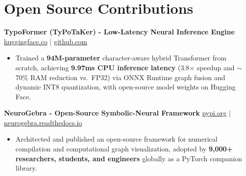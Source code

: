 \documentclass[9.5pt,a4paper]{article}
\begin{document}
\section*{Open Source Contributions}
\noindent
\textbf{TypoFormer (TyPoTaKer) - Low-Latency Neural Inference Engine} \hfill \href{https://huggingface.co/fahiiim/TypoFormer}{huggingface.co} $\vert$ \href{https://github.com/fahiiim/TyPoTaKer}{github.com}
\begin{itemize}
    \item Trained a \textbf{94M-parameter} character-aware hybrid Transformer from scratch, achieving \textbf{9.97ms CPU inference latency} (3.8$\times$ speedup and $\sim$70\% RAM reduction vs.\ FP32) via ONNX Runtime graph fusion and dynamic INT8 quantization, with open-source model weights on Hugging Face.
\end{itemize}
\vspace{0.6pt}
\noindent
\textbf{NeuroGebra - Open-Source Symbolic-Neural Framework} \hfill \href{https://pypi.org/project/neurogebra/}{pypi.org} $\vert$ \href{https://neurogebra.readthedocs.io}{neurogebra.readthedocs.io}
\begin{itemize}
    \item Architected and published an open-source framework for numerical compilation and computational graph visualization, adopted by \textbf{9,000+ researchers, students, and engineers} globally as a PyTorch companion library.
\end{itemize}
\vspace{0.6pt}
\end{document}
